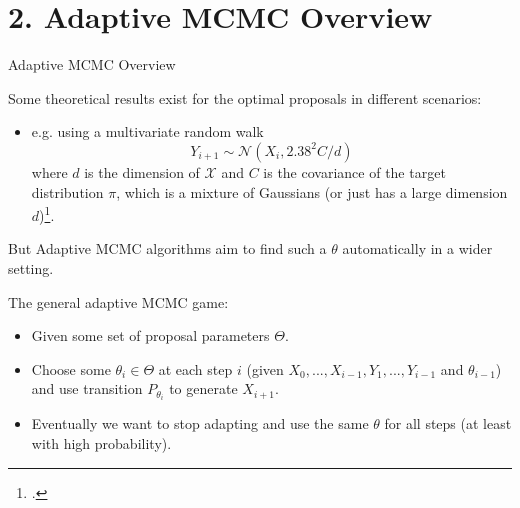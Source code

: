 \documentclass[aspectratio=169]{beamer}
\begin{document}
\section{2. Adaptive MCMC Overview}
\begin{frame}{Adaptive MCMC Overview}


    Some theoretical results exist for the optimal proposals in different scenarios:
    
    \begin{itemize}
        \item e.g. using a multivariate random walk 
            $$Y_{i+1} \sim \mathcal{N}(X_i, 2.38^2 C / d)$$
        where $d$ is the dimension of $\mathcal{X}$ and $C$ is the covariance of the target distribution $\pi$, which is a mixture of Gaussians (or just has a large dimension $d$)\footcite{roberts_optimal_2001}.
    \end{itemize} 

    \onslide<+->
    But Adaptive MCMC algorithms aim to find such a $\theta$ automatically in a wider setting.

    \vspace{1em}
    \onslide<+->
    The general adaptive MCMC game:
    \begin{itemize}[<+->]
        \item Given some set of proposal parameters $\Theta$.
        \item Choose some $\theta_i \in \Theta$ at each step $i$ (\alert{given $X_0, ..., X_{i-1}, Y_1, ..., Y_{i-1}$ and $\theta_{i-1}$}) and use transition $P_{\theta_i}$ to generate $X_{i+1}$.
        \item Eventually we want to stop adapting and use the same $\theta$ for all steps (at least with high probability).
    \end{itemize}

\end{frame}
\end{document}
